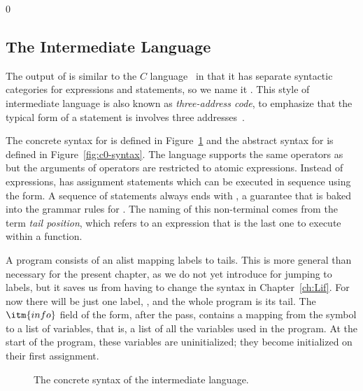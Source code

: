 \documentclass[7x10]{TimesAPriori_MIT}%
\def\racketEd{0}
\def\edition{1}
\begin{document}
{\if\edition\racketEd  
\subsection{The \LangCVar{} Intermediate Language}

The output of  is similar to the $C$
language~\citep{Kernighan:1988nx} in that it has separate syntactic
categories for expressions and statements, so we name it \LangCVar{}.
This style of intermediate language is also known as
\emph{three-address code}, to emphasize that the typical form of a
statement is  involves three
addresses~\citep{Aho:2006wb}.

The concrete syntax for \LangCVar{} is defined in
Figure~\ref{fig:c0-concrete-syntax} and the abstract syntax for
\LangCVar{} is defined in Figure~\ref{fig:c0-syntax}.
%
The \LangCVar{} language supports the same operators as \LangVar{} but
the arguments of operators are restricted to atomic
expressions. Instead of  expressions, \LangCVar{} has
assignment statements which can be executed in sequence using the
 form. A sequence of statements always ends with
, a guarantee that is baked into the grammar rules for
. The naming of this non-terminal comes from the term
\emph{tail position}, which refers to an
expression that is the last one to execute within a function.

A \LangCVar{} program consists of an alist mapping labels to
tails. This is more general than necessary for the present chapter, as
we do not yet introduce  for jumping to labels, but it saves
us from having to change the syntax in Chapter~\ref{ch:Lif}.  For now
there will be just one label, , and the whole program is
its tail.
%
The $\itm{info}$ field of the  form, after the
 pass, contains a mapping from the symbol
 to a list of variables, that is, a list of all the
variables used in the program. At the start of the program, these
variables are uninitialized; they become initialized on their first
assignment.

\begin{figure}[tbp]
\caption{The concrete syntax of the \LangCVar{} intermediate language.}
\label{fig:c0-concrete-syntax}
\end{figure}


}
\end{document}
